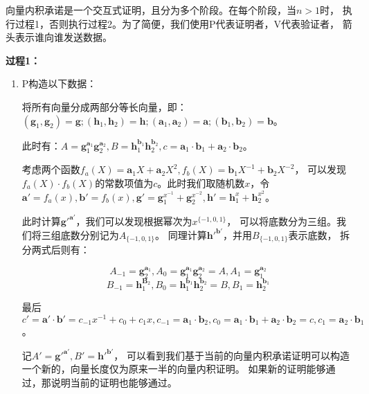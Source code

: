 向量内积承诺是一个交互式证明，且分为多个阶段。在每个阶段，当$n>1$时，
执行过程1，否则执行过程2。为了简便，我们使用P代表证明者，V代表验证者，
箭头表示谁向谁发送数据。

\textbf{过程1：}
\begin{enumerate}
    \item P构造以下数据：
    
    将所有向量分成两部分等长向量，即：$(\boldsymbol{g}_1, \boldsymbol{g}_2) = \boldsymbol{g}; (\boldsymbol{h}_1, \boldsymbol{h}_2) = \boldsymbol{h}; (\boldsymbol{a}_1, \boldsymbol{a}_2) = \boldsymbol{a}; (\boldsymbol{b}_1, \boldsymbol{b}_2) = \boldsymbol{b}$。
    
    此时有：$A=\boldsymbol{g}_1^{\boldsymbol{a}_1}\boldsymbol{g}_2^{\boldsymbol{a}_2},B=\boldsymbol{h}_1^{\boldsymbol{b}_1}\boldsymbol{h}_2^{\boldsymbol{b}_2},c=\boldsymbol{a}_1\cdot\boldsymbol{b}_1+\boldsymbol{a}_2\cdot\boldsymbol{b}_2$。
    
    考虑两个函数$f_a(X)=\boldsymbol{a}_1X + \boldsymbol{a}_2X^2, f_b(X)=\boldsymbol{b}_1X^{-1} + \boldsymbol{b}_2X^{-2}$，
    可以发现$f_a(X) \cdot f_b(X)$的常数项值为$c$。此时我们取随机数$x$，令$\boldsymbol{a}'=f_a(x), \boldsymbol{b}' = f_b(x), \boldsymbol{g}'=\boldsymbol{g}_1^{x^{-1}}+\boldsymbol{g}_2^{x^{-2}},\boldsymbol{h}'=\boldsymbol{h}_1^{x}+\boldsymbol{h}_2^{x^{2}}$。
    
    此时计算$\boldsymbol{g}'^{\boldsymbol{a}'}$，我们可以发现根据幂次为$x^{\{-1, 0, 1\}}$，
    可以将底数分为三组。我们将三组底数分别记为$A_{\{-1, 0, 1\}}$。
    同理计算$\boldsymbol{h}'^{\boldsymbol{b}'}$，并用$B_{\{-1, 0, 1\}}$表示底数，
    拆分两式后则有：
    
    $$A_{-1}=\boldsymbol{g}_2^{\boldsymbol{a}_1}, A_0=\boldsymbol{g}_1^{\boldsymbol{a}_1}\boldsymbol{g}_2^{\boldsymbol{a}_2}=A,A_1=\boldsymbol{g}_1^{\boldsymbol{a}_2}$$
    $$B_{-1}=\boldsymbol{h}_1^{\boldsymbol{B}_2}, B_0=\boldsymbol{h}_1^{\boldsymbol{b}_1}\boldsymbol{h}_2^{\boldsymbol{b}_2}=B,B_1=\boldsymbol{h}_2^{\boldsymbol{b}_1}$$
    
    最后$c'=\boldsymbol{a}'\cdot\boldsymbol{b}'=c_{-1}x^{-1}+c_0+c_1x, c_{-1}=\boldsymbol{a}_1\cdot\boldsymbol{b}_2,c_0=\boldsymbol{a}_1\cdot\boldsymbol{b}_1+\boldsymbol{a}_2\cdot\boldsymbol{b}_2=c,c_1=\boldsymbol{a}_2\cdot\boldsymbol{b}_1$。
    
    记$A'=\boldsymbol{g}'^{\boldsymbol{a}'}, B'=\boldsymbol{h}'^{\boldsymbol{b}'}$，
    可以看到我们基于当前的向量内积承诺证明可以构造一个新的，向量长度仅为原来一半的向量内积证明。
    如果新的证明能够通过，那说明当前的证明也能够通过。
    

\end{enumerate}
